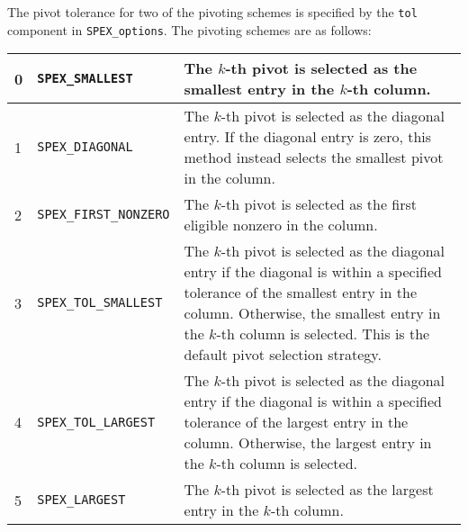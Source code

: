 \documentclass[12pt]{report}
\theoremstyle{definition}
\begin{document}
The pivot tolerance for two of the pivoting schemes is specified by the
\verb|tol| component in \verb|SPEX_options|.  The pivoting schemes are as
follows:

{\small
\begin{center}
\begin{tabular}{llp{4in}}
\hline
0 & \verb|SPEX_SMALLEST|        & The $k$-th pivot is selected as the smallest
                                  entry in the $k$-th column.\\
\hline
1 & \verb|SPEX_DIAGONAL|        & The $k$-th pivot is selected as the diagonal
                                  entry. If the diagonal entry is zero,
                                  this method instead selects the smallest
                                  pivot in the column.\\
\hline
2 & \verb|SPEX_FIRST_NONZERO|   & The $k$-th pivot is selected as the first
                                  eligible nonzero in the column. \\
\hline
3 & \verb|SPEX_TOL_SMALLEST|    & The $k$-th pivot is selected as the diagonal
                                  entry if the diagonal is within a
                                  specified tolerance of the smallest entry in
                                  the column. Otherwise, the smallest
                                  entry in the $k$-th column is selected.
                                  This is the default pivot selection
                                  strategy. \\
\hline
4 & \verb|SPEX_TOL_LARGEST|     & The $k$-th pivot is selected as the diagonal
                                  entry if the diagonal is within a
                                  specified tolerance of the largest entry in
                                  the column.  Otherwise, the largest
                                  entry in the $k$-th column is selected. \\
\hline
5 & \verb|SPEX_LARGEST|         & The $k$-th pivot is selected as the largest
                                  entry in the $k$-th column. \\
\hline
\end{tabular}
\end{center}
}

\end{document}
